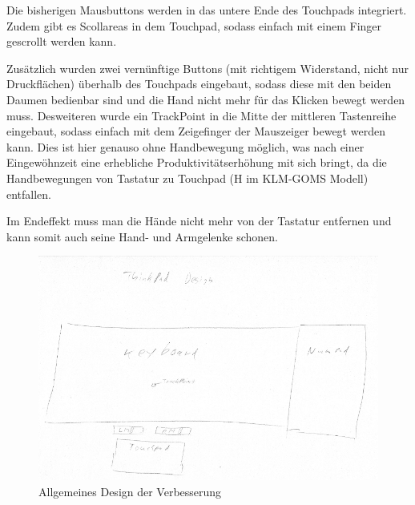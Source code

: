 \documentclass[a4paper,10pt]{scrartcl}
\begin{document}
Die bisherigen Mausbuttons werden in das untere Ende des Touchpads integriert. Zudem gibt es Scollareas in dem Touchpad, sodass einfach mit einem Finger gescrollt werden kann.

Zusätzlich wurden zwei vernünftige Buttons (mit richtigem Widerstand, nicht nur Druckflächen) überhalb des Touchpads eingebaut, sodass diese mit den beiden Daumen bedienbar sind und die Hand nicht mehr für das Klicken bewegt werden muss. 
Desweiteren wurde ein TrackPoint in die Mitte der mittleren Tastenreihe eingebaut, sodass einfach mit dem Zeigefinger der Mauszeiger bewegt werden kann. Dies ist hier genauso ohne Handbewegung möglich, was nach einer Eingewöhnzeit eine erhebliche Produktivitätserhöhung mit sich bringt, da die Handbewegungen von Tastatur zu Touchpad (H im KLM-GOMS Modell) entfallen.

Im Endeffekt muss man die Hände nicht mehr von der Tastatur entfernen und kann somit auch seine Hand- und Armgelenke schonen.

\begin{figure}
	\includegraphics[scale=0.5]{generalDesign_scaled}
	\caption{Allgemeines Design der Verbesserung}
\end{figure}
\end{document}
